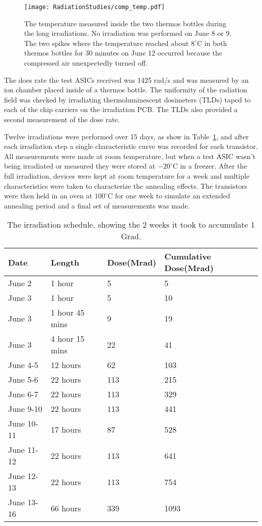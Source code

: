 \begin{figure}[h!]
\begin{center}
\texttt{[image: RadiationStudies/comp\_temp.pdf]}
\end{center}
\caption{The temperature measured inside the two thermos bottles during the long irradiations. No irradiation was performed on June 8 or 9. The two spikes where the temperature reached about $8^{\circ}\mathrm{C}$ in both thermos bottles for 30 minutes on June 12 occurred because the compressed air unexpectedly turned off.}
\label{fig:Temperature}
\end{figure}

The does rate the test ASICs received was 1425 rad/s and was measured by an ion chamber placed inside of a thermos bottle. The uniformity of the radiation field was checked by irradiating thermoluminescent dosimeters (TLDs) taped to each of the chip carriers on the irradiation PCB. The TLDs also provided a second measurement of the dose rate.

Twelve irradiations were performed over 15 days, as show in Table~\ref{tab:IrradiationSchedule}, and after each irradiation step a single characteristic curve was recorded for each transistor. All measurements were made at room temperature, but when a test ASIC wasn't being irradiated or measured they were stored at $-20^{\circ}\mathrm{C}$ in a freezer. After the full irradiation, devices were kept at room temperature for a week and multiple characteristics were taken to characterize the annealing effects. The transistors were then held in an oven at $100^{\circ}\mathrm{C}$ for one week to simulate an extended annealing period and a final set of measurements was made.

\begin{table}[h!]
\begin{center}
\caption{The irradiation schedule, showing the 2 weeks it took to accumulate 1 Grad.}
\begin{tabular}{| p{2cm} | p{2.5cm} | p{2cm} | p{4cm} |}
\hline
Date & Length & Dose(Mrad) & Cumulative Dose(Mrad)\\ \hline
June 2 & 1 hour & 5 & 5\\ \hline
June 3 & 1 hour & 5 & 10 \\ \hline
June 3 & 1 hour 45 mins & 9 & 19 \\ \hline
June 3 & 4 hour 15 mins & 22 & 41 \\ \hline
June 4-5 & 12 hours & 62 & 103 \\ \hline
June 5-6 & 22 hours & 113 & 215 \\ \hline
June 6-7 & 22 hours & 113 & 329 \\ \hline
June 9-10 & 22 hours & 113 & 441 \\ \hline
June 10-11 & 17 hours & 87 & 528 \\ \hline
June 11-12 & 22 hours & 113 & 641 \\ \hline
June 12-13 & 22 hours & 113 & 754 \\ \hline
June 13-16 & 66 hours & 339 & 1093 \\
\hline
\end{tabular}
\label{tab:IrradiationSchedule}
\end{center}
\end{table}


